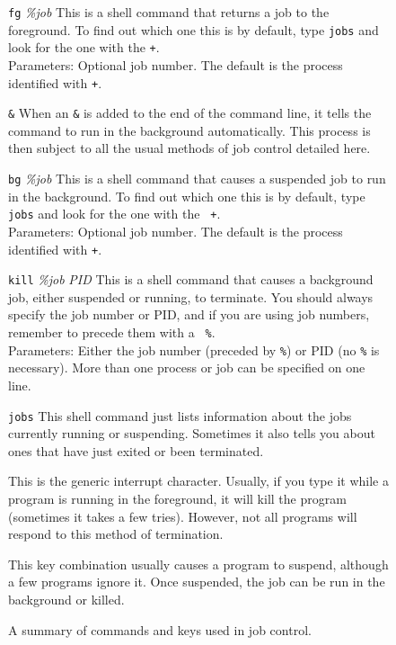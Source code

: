 \begin{figure}[tb]
\begin{dispitems}
\item [{\tt fg} {\sl \%job}] This is a shell command that returns a
  job to the foreground.  To find out which one this is by default,
  type {\tt jobs} and look for the one with the {\tt +}.\\ Parameters:
  Optional job number.  The default is the process identified
  with {\tt +}.

\item [{\tt \&}] When an {\tt \&} is added to the end of the command
  line, it tells the command to run in the background automatically.
  This process is then subject to all the usual methods of job control
  detailed here.

\item [{\tt bg} {\sl \%job}] This is a shell command that causes a
  suspended job to run in the background.  To find out which one this
  is by default, type {\tt jobs} and look for the one with the {\tt
    +}.\\ Parameters: Optional job number.  The default is
  the process identified with {\tt +}.

\item [{\tt kill} {\sl \%job} {\sl PID}] This is a shell
  command that causes a background job, either suspended or running,
  to terminate.  You should always specify the job number or PID, and
  if you are using job numbers, remember to precede them with a {\tt
    \%}.\\ Parameters: Either the job number (preceded by {\tt \%}) or
  PID (no {\tt \%} is necessary).  More than one process or job can be
  specified on one line.

\item [{\tt jobs}] This shell command just lists information about the
  jobs currently running or suspending.  Sometimes it also tells you
  about ones that have just exited or been terminated.

\item [\key{ctrl-c}]
        This is the generic interrupt character.  Usually, if you type
it while a program is running in the foreground, it will kill the
program (sometimes it takes a few tries).  However, not all programs
will respond to this method of termination.

\item [\key{ctrl-z}] This key combination usually causes a program to
  suspend, although a few programs ignore it.  Once suspended, the job
  can be run in the background or killed.
\end{dispitems}
\caption{A summary of commands and keys used in job control.}
\label{job-control}
\end{figure}

